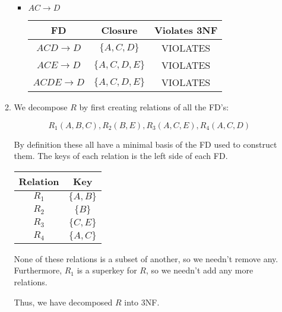 \documentclass[12pt,letterpaper]{article}
\begin{document}
\begin{enumerate}
\begin{enumerate}
\begin{itemize}
            \item $AC \rightarrow D$

              \begin{tabular}{c | c | c |}
                FD                    & Closure             & Violates 3NF \\
                \hline
                $ACD \rightarrow D$   & $\{A, C, D\}$       & VIOLATES \\
                \hline
                $ACE \rightarrow D$   & $\{A, C, D, E\}$    & VIOLATES \\
                \hline
                $ACDE \rightarrow D$  & $\{A, C, D, E\}$    & VIOLATES \\
                \hline
              \end{tabular}
          \end{itemize}

        \item
          We decompose $R$ by first creating relations of all the FD's:

          \[R_1(A, B, C), R_2(B, E), R_3(A, C, E), R_4(A, C, D)\]

          By definition these all have a minimal basis of the FD used to construct them.
          The keys of each relation is the left side of each FD.

          \begin{tabular}{c | c}
            Relation & Key \\
            \hline
            $R_1$    & $\{A, B\}$ \\
            $R_2$    & $\{B\}$ \\
            $R_3$    & $\{C, E\}$ \\
            $R_4$    & $\{A, C\}$ \\
          \end{tabular}

          None of these relations is a subset of another, so we needn't remove any.
          Furthermore, $R_1$ is a superkey for $R$, so we needn't add any more relations.

          Thus, we have decomposed $R$ into 3NF.

      \end{enumerate}
  \end{enumerate}
\end{document}
